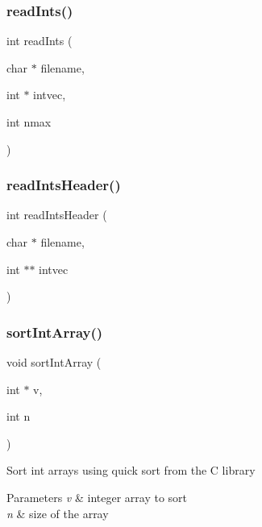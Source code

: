 \label{lib__util_8c_a8b7139ad6768a94ed9ef3c1658dbc0f0} 
\subsubsection{read\+Ints()}
{\footnotesize\ttfamily int read\+Ints (\begin{DoxyParamCaption}\item[{char $\ast$}]{filename,  }\item[{int $\ast$}]{intvec,  }\item[{int}]{nmax }\end{DoxyParamCaption})}

\label{lib__util_8c_a341dc1557d8a77725b8a75cfe55d0d9c} 
\subsubsection{read\+Ints\+Header()}
{\footnotesize\ttfamily int read\+Ints\+Header (\begin{DoxyParamCaption}\item[{char $\ast$}]{filename,  }\item[{int $\ast$$\ast$}]{intvec }\end{DoxyParamCaption})}

\label{lib__util_8c_a49ccd6574e920625e550611b866e0061} 
\subsubsection{sort\+Int\+Array()}
{\footnotesize\ttfamily void sort\+Int\+Array (\begin{DoxyParamCaption}\item[{int $\ast$}]{v,  }\item[{int}]{n }\end{DoxyParamCaption})}

Sort int arrays using quick sort from the C library


\begin{DoxyParams}{Parameters}
{\em v} & integer array to sort \\
\hline
{\em n} & size of the array \\
\hline
\end{DoxyParams}
\label{lib__util_8c_a208b2f2e1c8baf599e4dccc30d5cb68c} 
